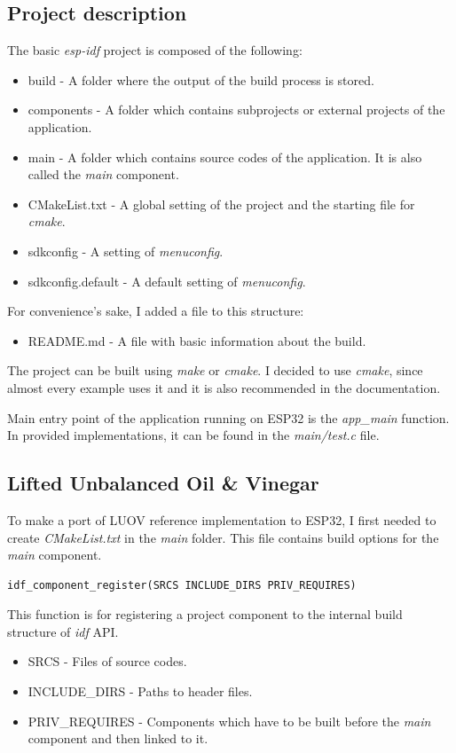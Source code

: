 \documentclass[thesis=M,english]{FITthesis}[2019/12/23]
\begin{document}
\subsection{Project description}
The basic \textit{esp-idf} project is composed of the following:
\begin{itemize}
\item	build - A folder where the output of the build process is stored.
\item	components - A folder which contains subprojects or external projects of the application.
\item	main - A folder which contains source codes of the application. It is also called the \textit{main} component.
\item	CMakeList.txt - A global setting of the project and the starting file for \textit{cmake}.
\item	sdkconfig - A setting of \textit{menuconfig}.
\item	sdkconfig.default - A default setting of \textit{menuconfig}.
\end{itemize}
For convenience’s sake, I added a file to this structure:
\begin{itemize}
\item	README.md - A file with basic information about the build.
\end{itemize}

\noindent
The project can be built using \textit{make} or \textit{cmake}. I decided to use \textit{cmake}, since almost every example uses it and it is also recommended in the documentation. 

\bigskip
\noindent
Main entry point of the application running on ESP32 is the \textit{app\_main} function. In provided implementations, it can be found in the \textit{main/test.c} file.

\subsection{Lifted Unbalanced Oil \& Vinegar} \label{esp-luov-make}
To make a port of LUOV reference implementation to ESP32, I first needed to create \textit{CMakeList.txt} in the \textit{main} folder. This file contains build options for the \textit{main} component.
\begin{lstlisting}[frame=single]
idf_component_register(SRCS INCLUDE_DIRS PRIV_REQUIRES)
\end{lstlisting}
This function is for registering a project component to the internal build structure of \textit{idf} API.
\begin{itemize}
\item	SRCS - Files of source codes.
\item	INCLUDE\_DIRS - Paths to header files.
\item	PRIV\_REQUIRES - Components which have to be built before the \textit{main} component and then linked to it.
\end{itemize}
\end{document}
